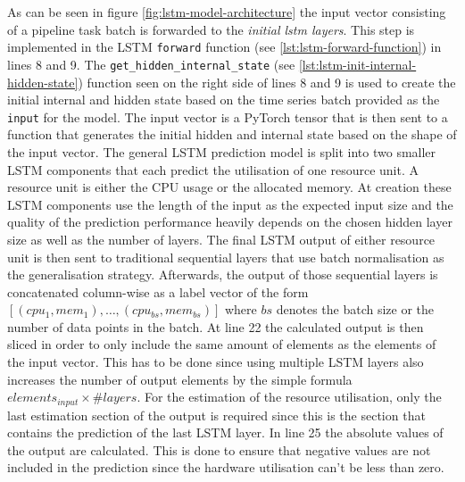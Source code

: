   As can be seen in figure \ref{fig:lstm-model-architecture} the input vector consisting of a pipeline task batch is forwarded to the \emph{initial lstm layers}. This step is implemented in the LSTM \texttt{forward} function (see \ref{lst:lstm-forward-function}) in lines 8 and 9. The \texttt{get\_hidden\_internal\_state} (see \ref{lst:lstm-init-internal-hidden-state}) function seen on the right side of lines 8 and 9 is used to create the initial internal and hidden state based on the time series batch provided as the \texttt{input} for the model. The input vector is a PyTorch tensor that is then sent to a function that generates the initial hidden and internal state based on the shape of the input vector.
  The general LSTM prediction model is split into two smaller LSTM components that each predict the utilisation of one resource unit. A resource unit is either the CPU usage or the allocated memory. At creation these LSTM components use the length of the input as the expected input size and the quality of the prediction performance heavily depends on the chosen hidden layer size as well as the number of  layers.
  The final LSTM output of either resource unit is then sent to traditional sequential layers that use batch normalisation as the generalisation strategy.
  Afterwards, the output of those sequential layers is concatenated column-wise as a label vector of the form $\left[(cpu_1, mem_1), \dots, (cpu_{bs}, mem_{bs})\right]$ where $bs$ denotes the batch size or the number of data points in the batch.
  At line 22 the calculated output is then sliced in order to only include the same amount of elements as the elements of the input vector. This has to be done since using multiple LSTM layers also increases the number of output elements by the simple formula $elements_{input} \times \#layers$. For the estimation of the resource utilisation, only the last estimation section of the output is required since this is the section that contains the prediction of the last LSTM layer.
  In line 25 the absolute values of the output are calculated. This is done to ensure that negative values are not included in the prediction since the hardware utilisation can't be less than zero.
  

  


